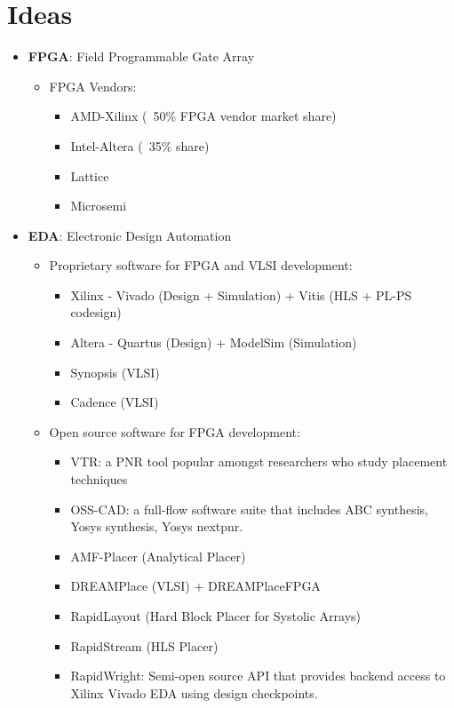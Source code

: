 \documentclass{article}
\begin{document}
\section{Ideas}
\begin{itemize}[label={\textbullet}, left=0.25cm]
    \item \textbf{FPGA}: Field Programmable Gate Array
    \begin{itemize}[label={--}, left=0.25cm]
        \item FPGA Vendors:
        \begin{itemize}[label={$\cdot$}, left=0.25cm]
            \item AMD-Xilinx (~50\% FPGA vendor market share)
            \item Intel-Altera (~35\% share)
            \item Lattice
            \item Microsemi
        \end{itemize}
    \end{itemize}

    \item \textbf{EDA}: Electronic Design Automation
    \begin{itemize}[label={--}, left=0.25cm]
        \item Proprietary software for FPGA and VLSI development:
        \begin{itemize}[label={$\cdot$}, left=0.25cm]
            \item Xilinx - Vivado (Design + Simulation) + Vitis (HLS + PL-PS codesign)
            \item Altera - Quartus (Design) + ModelSim (Simulation)
            \item Synopsis (VLSI)
            \item Cadence (VLSI)
        \end{itemize}
        \item Open source software for FPGA development:
        \begin{itemize}[label={$\cdot$}, left=0.25cm]
            \item VTR: a PNR tool popular amongst researchers who study placement techniques
            \item OSS-CAD: a full-flow software suite that includes ABC synthesis, Yosys synthesis, Yosys nextpnr.
            \item AMF-Placer (Analytical Placer)
            \item DREAMPlace (VLSI) + DREAMPlaceFPGA
            \item RapidLayout (Hard Block Placer for Systolic Arrays)
            \item RapidStream (HLS Placer)
            \item RapidWright: Semi-open source API that provides backend access to Xilinx Vivado EDA using design checkpoints.
            

\end{itemize}
\end{itemize}
\end{itemize}
\end{document}

